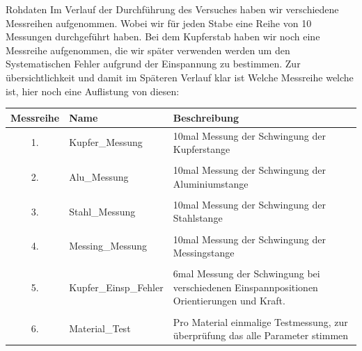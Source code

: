\documentclass[twoside]{protokoll}
\begin{document}
\begin{aufgabe}{Rohdaten}
Im Verlauf der Durchführung des Versuches haben wir verschiedene Messreihen aufgenommen. Wobei wir für jeden Stabe eine Reihe von 10 Messungen durchgeführt haben. Bei dem Kupferstab haben wir noch eine Messreihe aufgenommen, die wir später verwenden werden um den Systematischen Fehler aufgrund der Einspannung zu bestimmen. Zur übersichtlichkeit und damit im Späteren Verlauf klar ist Welche Messreihe welche ist, hier noch eine Auflistung von diesen:\\

    \begin{table}[H]
        \centering
        \begin{tabularx}{1\textwidth}{c X X} 
            \toprule
            \textbf{Messreihe} & \textbf{Name} & \textbf{Beschreibung} \\
            \midrule
            1. & Kupfer\_Messung & 10mal Messung der Schwingung der Kupferstange \\\\
            2. & Alu\_Messung & 10mal Messung der Schwingung der Aluminiumstange \\\\
            3. & Stahl\_Messung & 10mal Messung der Schwingung der Stahlstange \\\\
            4. & Messing\_Messung & 10mal Messung der Schwingung der Messingstange \\\\
            5. & Kupfer\_Einsp\_Fehler & 6mal Messung der Schwingung bei verschiedenen 				Einspannpositionen Orientierungen und Kraft.  \\\\  
            6. & Material\_Test & Pro Material einmalige Testmessung, zur überprüfung das alle Parameter stimmen \\
            \bottomrule
        \end{tabularx}
        \label{tab:mytable}
    \end{table}


\end{aufgabe}
\end{document}
